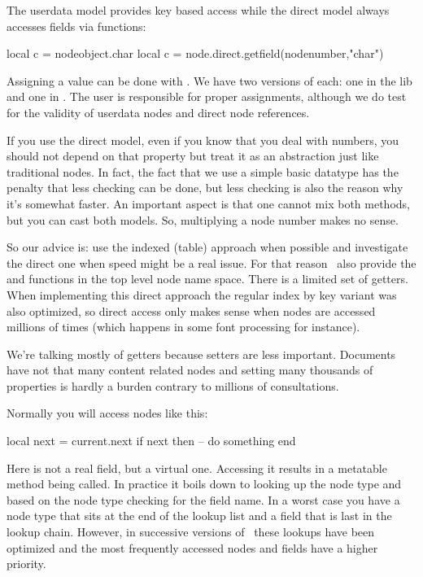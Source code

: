 The userdata model provides key based access while the direct model always
accesses fields via functions:

\starttyping[option=LUA]
local c = nodeobject.char
local c = node.direct.getfield(nodenumber,"char")
\stoptyping

Assigning a value can be done with . We have two versions of
each: one in the  lib and one in . The user is
responsible for proper assignments, although we do test for the validity of
userdata nodes and direct node references.

If you use the direct model, even if you know that you deal with numbers, you
should not depend on that property but treat it as an abstraction just like
traditional nodes. In fact, the fact that we use a simple basic datatype has the
penalty that less checking can be done, but less checking is also the reason why
it's somewhat faster. An important aspect is that one cannot mix both methods,
but you can cast both models. So, multiplying a node number makes no sense.

So our advice is: use the indexed (table) approach when possible and investigate
the direct one when speed might be a real issue. For that reason \LUATEX\ also
provide the  and  functions in the top level node
name space. There is a limited set of getters. When implementing this direct
approach the regular index by key variant was also optimized, so direct access
only makes sense when nodes are accessed millions of times (which happens in some
font processing for instance).

We're talking mostly of getters because setters are less important. Documents
have not that many content related nodes and setting many thousands of properties
is hardly a burden contrary to millions of consultations.

Normally you will access nodes like this:

\starttyping
local next = current.next
if next then
    -- do something
end
\stoptyping

Here  is not a real field, but a virtual one. Accessing it results in
a metatable method being called. In practice it boils down to looking up the node
type and based on the node type checking for the field name. In a worst case you
have a node type that sits at the end of the lookup list and a field that is last
in the lookup chain. However, in successive versions of \LUATEX\ these lookups
have been optimized and the most frequently accessed nodes and fields have a
higher priority.

